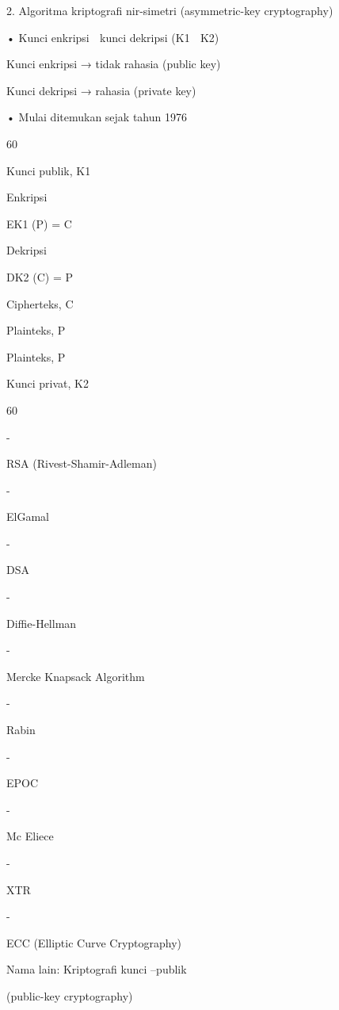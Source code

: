 \documentclass{article}
\begin{document}

2.  Algoritma kriptografi nir-simetri (asymmetric-key cryptography)

•  Kunci enkripsi  kunci dekripsi (K1  K2)

     Kunci enkripsi → tidak rahasia (public key)

     Kunci dekripsi → rahasia (private key)

• Mulai ditemukan sejak tahun 1976

60

Kunci publik, K1

Enkripsi

EK1 (P) = C

Dekripsi

DK2 (C) = P

Cipherteks, C

Plainteks, P

Plainteks, P

Kunci privat, K2

60

-

RSA (Rivest-Shamir-Adleman)

-

ElGamal

-

DSA

-

Diffie-Hellman 

-

Mercke Knapsack Algorithm

-

Rabin

-

EPOC

-

Mc Eliece

-

XTR

-

ECC (Elliptic Curve Cryptography)

Nama lain: Kriptografi kunci –publik 

(public-key cryptography)
\end{document}
